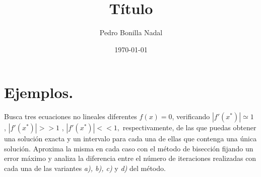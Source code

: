 \documentclass[11pt,a4paper]{article}
\title{Título}
\author{Pedro Bonilla Nadal}
\date{\today}
\begin{document}
\maketitle

\section{Ejemplos.} Busca tres ecuaciones no lineales diferentes $f (x) = 0$, verificando $ |f'(x^* )| \simeq 1$ , $ |f'(x^*)| >> 1$ , $ |f'(x^* )| << 1,$ respectivamente, de las que puedas obtener una solución exacta y un intervalo para cada una de ellas que contenga una única solución. Aproxima la misma en cada caso con el método de bisección fijando un error máximo y analiza la diferencia entre el número de iteraciones realizadas con cada una de las variantes \emph{a), b), c)} y \emph{d) }del método.\\
\end{document}
